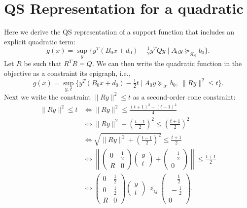 
\section{QS Representation for a quadratic} \label{sec:qs-soc}

Here we derive the QS representation of a support function that
includes an explicit quadratic term:
\[
 g(x)=\sup_y\{y^T(B_0x+d_0)-\tfrac{1}{2} y^T Q y \mid A_0y\succeq_{\mathcal{K}_0} b_0\}.
\]
Let $R$ be such that $R^T R = Q$.  We can then write the
quadratic function in the objective as a constraint its epigraph,
i.e.,
\[
  g(x)
  =\sup_{y,\,t}
  \{
    y^T(B_{0}x+d_{0})-\tfrac{1}{2} t \mid
    A_{0}y\succeq_{\mathcal{K}}b_{0},\ \|Ry\|^2 \leq t\}.
\]
Next we write the constraint $\|Ry\|^2 \leq t$ as a second-order cone
constraint:
\begin{align*}
  \|Ry\|^{2}\leq t & \iff\|Ry\|^{2}\leq\frac{(t+1)^{2}-(t-1)^{2}}{4}
\\&\iff
   \|Ry\|^{2}+\left(\frac{t-1}{2}\right)^{2}
    \leq\left(\frac{t+1}{2}\right)^{2}
\\
 &\iff
 \sqrt{\|Ry\|^{2}+\left(\frac{t-1}{2}\right)^{2}}\leq\frac{t+1}{2}\\
 &\iff
 \left\|
   \begin{pmatrix}
     0 & \tfrac{1}{2}\\
     R & 0
   \end{pmatrix}
   \begin{pmatrix}y\\t\end{pmatrix}
  +\begin{pmatrix}-\tfrac{1}{2}\\0\end{pmatrix}
  \right\|\leq\frac{t+1}{2}\\
 &\iff
   \begin{pmatrix}
     0 & \tfrac{1}{2}\\
     0 & \tfrac{1}{2}\\
     R & 0
   \end{pmatrix}
   \begin{pmatrix}y\\t\end{pmatrix}
  \preceq_{Q}
  \begin{pmatrix}
      \phantom-\tfrac{1}{2}
    \\\       -\tfrac{1}{2}
    \\0\end{pmatrix}.
\end{align*}
